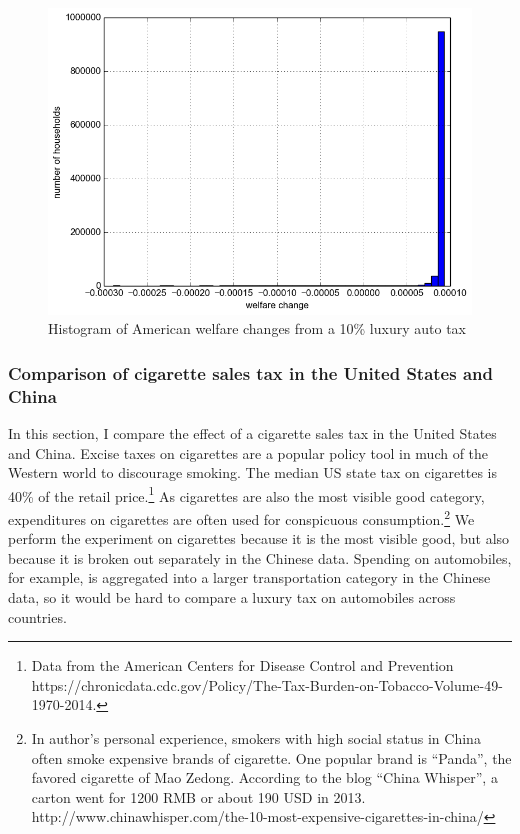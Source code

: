 \documentclass[11pt]{article}
\begin{document}
\begin{CJK}{UTF8}{gbsn}
\begin{figure}
    \centering
	\includegraphics[scale=.6]{pics/tax_hist_Car10.png}
    \caption{Histogram of American welfare changes from a 10\% luxury auto tax}
    \label{fig:wel_change_10}
\end{figure}

\subsubsection{Comparison of cigarette sales tax in the United States and China}

In this section, I compare the effect of a cigarette sales tax in the United States and China.  Excise taxes on cigarettes are a popular policy tool in much of the Western world to discourage smoking.  The median US state tax on cigarettes is 40\% of the retail price.\footnote{Data from the American Centers for Disease Control and Prevention https://chronicdata.cdc.gov/Policy/The-Tax-Burden-on-Tobacco-Volume-49-1970-2014.}  As cigarettes are also the most visible good category, expenditures on cigarettes are often used for conspicuous consumption.\footnote{In author's personal experience, smokers with high social status in China often smoke expensive brands of cigarette.  One popular brand is ``Panda'', the favored cigarette of Mao Zedong.  According to the blog ``China Whisper'', a carton went for 1200 RMB or about 190 USD in 2013. http://www.chinawhisper.com/the-10-most-expensive-cigarettes-in-china/}  We perform the experiment on cigarettes because it is the most visible good, but also because it is broken out separately in the Chinese data.  Spending on automobiles, for example, is aggregated into a larger transportation category in the Chinese data, so it would be hard to compare a luxury tax on automobiles across countries.


\end{CJK}
\end{document}
